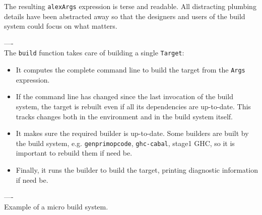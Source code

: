 The resulting \texttt{alexArgs} expression is terse and readable. All
distracting plumbing details have been abstracted away so that the
designers and users of the build system could focus on what matters.

\noindent ----\\
\noindent The \texttt{build} function takes care of building a single
\texttt{Target}:
\begin{itemize}
  \item It computes the complete command line to build the target from the
  \texttt{Args} expression.
  \item If the command line has changed since the last invocation of the build
  system, the target is rebuilt even if all its dependencies are up-to-date.
  This tracks changes both in the environment and in the build system itself.
  \item It makes sure the required builder is up-to-date. Some builders are
  built by the build system, e.g. \texttt{genprimopcode}, \texttt{ghc-cabal},
  stage1 GHC, so it is important to rebuild them if need be.
  \item Finally, it runs the builder to build the target, printing diagnostic
  information if need be.
\end{itemize}

\noindent ----\\
\noindent Example of a micro build system.

\newcommand{\tabx}[1]{\hspace{.106\textwidth}\rlap{#1}}
\newcommand{\taby}[1]{\hspace{.103\textwidth}\rlap{#1}}
\newcommand{\tabz}[1]{\hspace{.24\textwidth}\rlap{#1}}

